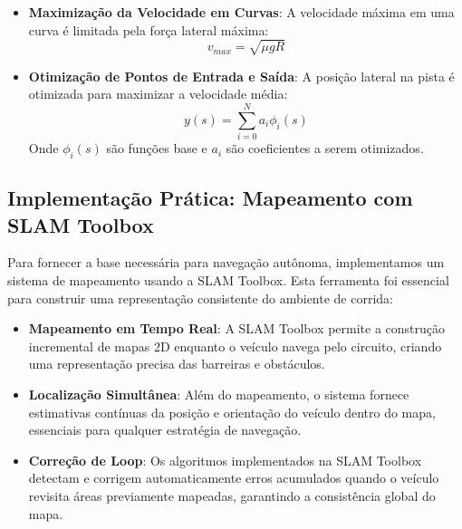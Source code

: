 \begin{itemize}
    \item \textbf{Maximização da Velocidade em Curvas}: A velocidade máxima em uma curva é limitada pela força lateral máxima:
          \begin{equation}
              v_{max} = \sqrt{\mu g R}
              \label{eq:max_cornering_speed}
          \end{equation}

    \item \textbf{Otimização de Pontos de Entrada e Saída}: A posição lateral na pista é otimizada para maximizar a velocidade média:
          \begin{equation}
              y(s) = \sum_{i=0}^N a_i \phi_i(s)
              \label{eq:racing_line_optimization}
          \end{equation}
          Onde $\phi_i(s)$ são funções base e $a_i$ são coeficientes a serem otimizados.
\end{itemize}

\subsection{Implementação Prática: Mapeamento com SLAM Toolbox}
\label{sec:implementacao_pratica}

Para fornecer a base necessária para navegação autônoma, implementamos um
sistema de mapeamento usando a SLAM Toolbox. Esta ferramenta foi essencial para
construir uma representação consistente do ambiente de corrida:

\begin{itemize}
    \item \textbf{Mapeamento em Tempo Real}: A SLAM Toolbox permite a construção incremental de mapas 2D enquanto o veículo navega pelo circuito, criando uma representação precisa das barreiras e obstáculos.

    \item \textbf{Localização Simultânea}: Além do mapeamento, o sistema fornece estimativas contínuas da posição e orientação do veículo dentro do mapa, essenciais para qualquer estratégia de navegação.

    \item \textbf{Correção de Loop}: Os algoritmos implementados na SLAM Toolbox detectam e corrigem automaticamente erros acumulados quando o veículo revisita áreas previamente mapeadas, garantindo a consistência global do mapa.
\end{itemize}

